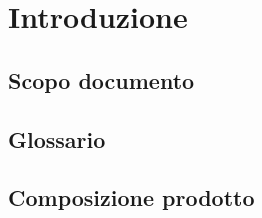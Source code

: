 \section{Introduzione}

\subsection{Scopo documento}

\subsection{Glossario}
 
\subsection{Composizione prodotto}
